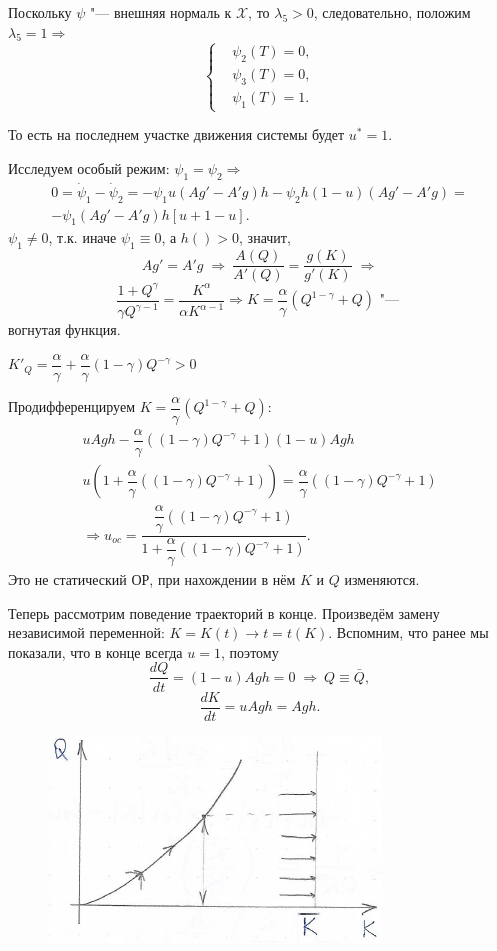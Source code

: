\documentclass[12pt, a4paper]{article}
\theoremstyle{rusdef}
\newcommand{\X}{\mathscr{X}} %
\DeclareMathOperator*{\thus}{\Rightarrow} %
\begin{document}
Поскольку $\psi$ "--- внешняя нормаль к $\X$, то $\lambda_5 > 0$, следовательно, положим $\lambda_5 = 1 \thus$
\[
  \left\{
    \begin{aligned}
      &\psi_2(T) = 0,\\
      &\psi_3(T) = 0,\\
      &\psi_1(T) = 1.
    \end{aligned}
  \right.
\]

То есть на последнем участке движения системы будет $u^* = 1$.

Исследуем особый режим: $\psi_1 = \psi_2 \thus$
\begin{gather*}
  0 = \dot{\psi}_1 - \dot{\psi}_2 = -\psi_1u(Ag' - A'g)h - \psi_2 h(1-u)(Ag' - A'g) = \\
  -\psi_1(Ag' - A'g) h[u + 1 - u].
\end{gather*}
$\psi_1 \neq 0$, т.к. иначе $\psi_1 \equiv 0$, а $h() > 0$, значит,
\[
  Ag' = A'g \;\thus\: \dfrac{A(Q)}{A'(Q)} = \dfrac{g(K)}{g'(K)} \;\thus
\]
\[
  \dfrac{1 + Q^{\gamma}}{\gamma Q^{\gamma - 1}} = \dfrac{K^{\alpha}}{\alpha K^{\alpha-1}} \thus K = \dfrac{\alpha}{\gamma}(Q^{1 - \gamma} + Q) \text{ "--- }
\]
вогнутая функция.

$K'_Q = \dfrac{\alpha}{\gamma} + \dfrac{\alpha}{\gamma}(1-\gamma)Q^{-\gamma} > 0$

Продифференцируем $K = \dfrac{\alpha}{\gamma}(Q^{1 - \gamma} + Q)$:
\begin{gather*}
  uAgh - \dfrac{\alpha}{\gamma}\left((1-\gamma)Q^{-\gamma}+1\right)(1-u)Agh \\
  u(1 + \dfrac{\alpha}{\gamma}\left((1-\gamma)Q^{-\gamma} + 1\right)) = \dfrac{\alpha}{\gamma} \left((1-\gamma)Q^{-\gamma} + 1\right) \\
  \thus u_{oc} = \dfrac{\dfrac{\alpha}{\gamma} \left((1-\gamma)Q^{-\gamma} + 1\right)}{1 + \dfrac{\alpha}{\gamma}\left((1-\gamma)Q^{-\gamma} + 1\right)}.
\end{gather*}
Это не статический ОР, при нахождении в нём $K$ и $Q$ изменяются.

Теперь рассмотрим поведение траекторий в конце. Произведём замену независимой переменной: $K = K(t) \to t = t(K)$. Вспомним, что ранее мы показали, что в конце всегда $u = 1$, поэтому
\[
  \dfrac{dQ}{dt} = (1-u) Agh = 0 \;\thus\: Q \equiv \bar{Q},
\]
\[
  \dfrac{dK}{dt} = uAgh = Agh.
\]

\begin{figure}[ht]
  \center
  \includegraphics{pic5.png}
\end{figure}
\end{document}
